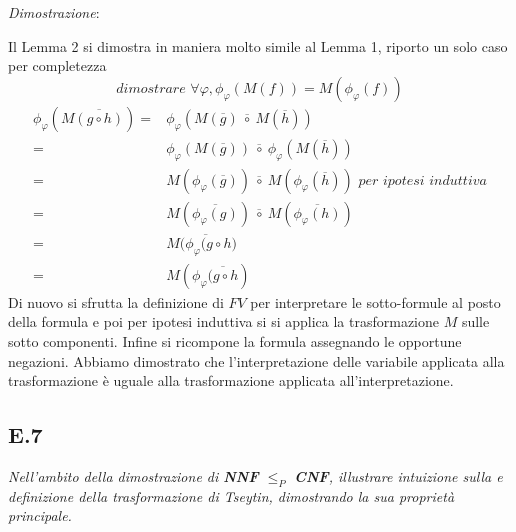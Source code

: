 \documentclass[a4paper]{article}
\newenvironment{dimostrazione}{\textit{Dimostrazione}:\begin{adjustwidth}{1cm}{}}{\end{adjustwidth}}
\begin{document}
\begin{dimostrazione}
	Il Lemma 2 si dimostra in maniera molto simile al Lemma 1, riporto un solo caso per completezza
	$$\textit{dimostrare } \forall \varphi, \phi_\varphi(M(f)) = M(\phi_\varphi(f)) $$
	\begin{align*}
		\phi_\varphi(M \overline{(g \circ h)}) =& \phi_\varphi(M(\overline g) \: \overline \circ \: M(\overline h))\\
			=& \phi_\varphi(M(\overline g)) \: \overline \circ \: \phi_\varphi(M(\overline h))\\
			=& M(\phi_\varphi(\overline g)) \: \overline \circ \: M(\phi_\varphi(\overline h)) \textit{  per ipotesi induttiva}\\
			=& M(\overline{\phi_\varphi(g)}) \: \overline \circ \: M(\overline{\phi_\varphi(h)})\\
			=& M\overline{(\phi_\varphi (g \circ h})\\
			=& M(\phi_\varphi \overline{(g \circ h})
                \end{align*}
	Di nuovo si sfrutta la definizione di $FV$ per interpretare le sotto-formule al posto della formula e poi per ipotesi induttiva si si applica la trasformazione $M$ sulle sotto componenti.
	Infine si ricompone la formula assegnando le opportune negazioni.
	Abbiamo dimostrato che l'interpretazione delle variabile applicata alla trasformazione è uguale alla trasformazione applicata all'interpretazione.
\end{dimostrazione}
\subsection{E.7}
\emph{Nell’ambito della dimostrazione di \textbf{NNF} $\leq_P$ \textbf{CNF}, illustrare intuizione sulla e definizione della trasformazione di Tseytin, dimostrando la sua proprietà principale.}
\end{document}
